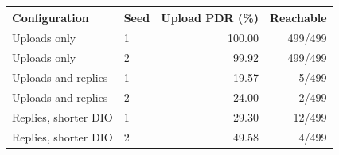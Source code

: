 \begin{tabular}{llrr}
\hline
Configuration & Seed & Upload PDR (\%) & Reachable\\
\hline
Uploads only & 1 & 100.00 & 499/499\\
Uploads only & 2 & 99.92 & 499/499\\
Uploads and replies & 1 & 19.57 & 5/499\\
Uploads and replies & 2 & 24.00 & 2/499\\
Replies, shorter DIO & 1 & 29.30 & 12/499\\
Replies, shorter DIO & 2 & 49.58 & 4/499\\
\hline
\end{tabular}
